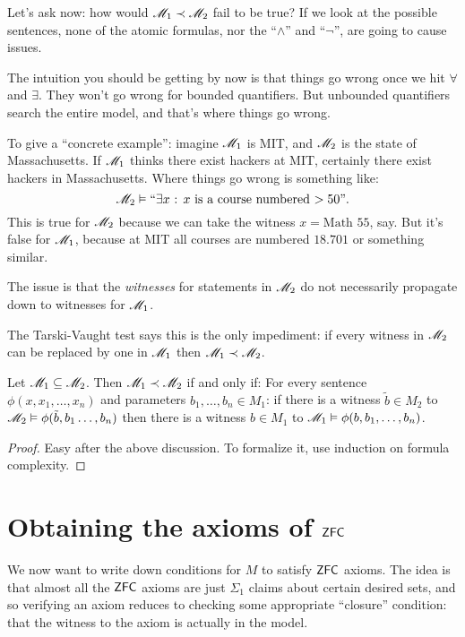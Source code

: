 Let's ask now: how would $\mathscr M_1 \prec \mathscr M_2$ fail to be true?
If we look at the possible sentences, none of the atomic formulas,
nor the ``$\land$'' and ``$\neg$'', are going to cause issues.

The intuition you should be getting by now is that things go
wrong once we hit $\forall$ and $\exists$.
They won't go wrong for bounded quantifiers.
But unbounded quantifiers search the entire model, and that's where things go wrong.

To give a ``concrete example'':
imagine $\mathscr M_1$ is MIT, and $\mathscr M_2$ is the state of Massachusetts.
If $\mathscr M_1$ thinks there exist hackers at MIT,
certainly there exist hackers in Massachusetts.
Where things go wrong is something like:
\[ \mathscr M_2 \vDash \text{``$\exists x$ : $x$ is a course numbered $> 50$''}. \]
This is true for $\mathscr M_2$ because we can
take the witness $x = \text{Math 55}$, say.
But it's false for $\mathscr M_1$,
because at MIT all courses are numbered $18.701$ or something similar.
\begin{moral}
	The issue is that the \emph{witnesses}
	for statements in $\mathscr M_2$ do not necessarily propagate
	down to witnesses for $\mathscr M_1$.
\end{moral}

The Tarski-Vaught test says this is the only impediment:
if every witness in $\mathscr M_2$ can be replaced by one in $\mathscr M_1$ then $\mathscr M_1 \prec \mathscr M_2$.
\begin{lemma}
	Let $\mathscr M_1 \subseteq \mathscr M_2$.
	Then $\mathscr M_1 \prec \mathscr M_2$ if and only if:
	For every sentence $\phi(x, x_1, \dots, x_n)$ and parameters
	$b_1, \dots, b_n \in M_1$:
	if there is a witness $\tilde b \in M_2$
	to $\mathscr M_2 \vDash \phi(\tilde b, b_1 \dots, b_n)$
	then there is a witness $b \in M_1$ to $\mathscr M_1 \vDash \phi(b, b_1, \dots, b_n)$.
\end{lemma}
\begin{proof}
	Easy after the above discussion.
	To formalize it, use induction on formula complexity.
\end{proof}

\section{Obtaining the axioms of $\mathsf{ZFC}$}
We now want to write down conditions for $M$ to satisfy $\mathsf{ZFC}$ axioms.
The idea is that almost all the $\mathsf{ZFC}$ axioms are just $\Sigma_1$
claims about certain desired sets,
and so verifying an axiom reduces to checking some appropriate ``closure'' condition:
that the witness to the axiom is actually in the model.

